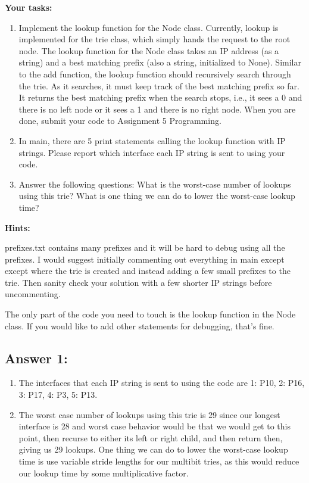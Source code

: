 \documentclass[10pt]{article}
\newenvironment{problem}[2][Problem]{\begin{trivlist}
\item[\hskip \labelsep {\bfseries #1}\hskip \labelsep {\bfseries #2.}]}{\end{trivlist}}
\begin{document}
\begin{problem}{1: Trie to Return the Correct Interface}
\begin{enumerate}
\textbf{Your tasks:}
\begin{enumerate}
    \item Implement the lookup function for the Node class. Currently, lookup is implemented for the trie class, which simply hands the request to the root node. The lookup function for the Node class takes an IP address (as a string) and a best matching prefix (also a string, initialized to None). Similar to the add function, the lookup function should recursively search through the trie. As it searches, it must keep track of the best matching prefix so far. It returns the best matching prefix when the search stops, i.e., it sees a 0 and there is no left node or it sees a 1 and there is no right node. When you are done, submit your code to Assignment 5 Programming.
    \item In main, there are 5 print statements calling the lookup function with IP strings. Please report which interface each IP string is sent to using your code.
    \item Answer the following questions: What is the worst-case number of lookups using this trie? What is one thing we can do to lower the worst-case lookup time?
\end{enumerate}

\textbf{Hints:} 

prefixes.txt contains many prefixes and it will be hard to debug using all the prefixes. I would suggest initially commenting out everything in main except except where the trie is created and instead adding a few small prefixes to the trie. Then sanity check your solution with a few shorter IP strings before uncommenting. 

The only part of the code you need to touch is the lookup function in the Node class. If you would like to add other statements for debugging, that's fine.


\end{enumerate}
\end{problem}

\subsection*{Answer 1:}
\begin{enumerate}
    \item[(b)] The interfaces that each IP string is sent to using the code are 1: P10, 2: P16, 3: P17, 4: P3, 5: P13.
    \item[(c)] The worst case number of lookups using this trie is 29 since our longest interface is 28 and worst case behavior would be that we would get to this point, then recurse to either its left or right child, and then return then, giving us 29 lookups. One thing we can do to lower the worst-case lookup time is use variable stride lengths for our multibit tries, as this would reduce our lookup time by some multiplicative factor.
\end{enumerate}
\end{document}

